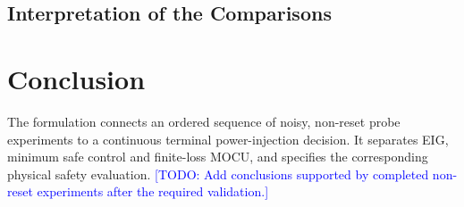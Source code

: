 \documentclass[journal]{IEEEtran}
\newcommand{\todo}[1]{\textcolor{blue}{[TODO: #1]}}
\begin{document}
\subsection{Interpretation of the Comparisons}

\section{Conclusion}
\label{sec:conclusion}
The formulation connects an ordered sequence of noisy, non-reset probe
experiments to a continuous terminal power-injection decision. It separates
EIG, minimum safe control and finite-loss MOCU, and specifies the corresponding
physical safety evaluation. \todo{Add conclusions supported by completed
non-reset experiments after the required validation.}



\end{document}
